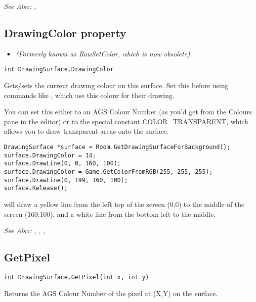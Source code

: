 \it{See Also:} ,


\subsection{DrawingColor property}\label{DrawingSurface.DrawingColor}%

\begin{itemize}
\item \it{(Formerly known as RawSetColor, which is now obsolete)}
\end{itemize}

\begin{verbatim}
int DrawingSurface.DrawingColor
\end{verbatim}
Gets/sets the current drawing colour on this surface. Set this before using commands
like , which use this colour for
their drawing.

You can set this either to an AGS Colour Number (as you'd get from the Colours pane
in the editor) or to the special constant COLOR_TRANSPARENT, which allows you
to draw transparent areas onto the surface.

\begin{verbatim}
DrawingSurface *surface = Room.GetDrawingSurfaceForBackground();
surface.DrawingColor = 14;
surface.DrawLine(0, 0, 160, 100);
surface.DrawingColor = Game.GetColorFromRGB(255, 255, 255);
surface.DrawLine(0, 199, 160, 100);
surface.Release();
\end{verbatim}
will draw a yellow line from the left top of the screen (0,0) to the middle of the screen (160,100),
and a white line from the bottom left to the middle.

\it{See Also:} ,
,
,


\subsection{GetPixel}\label{DrawingSurface.GetPixel}%

\begin{verbatim}
int DrawingSurface.GetPixel(int x, int y)
\end{verbatim}
Returns the AGS Colour Number of the pixel at (X,Y) on the surface.

